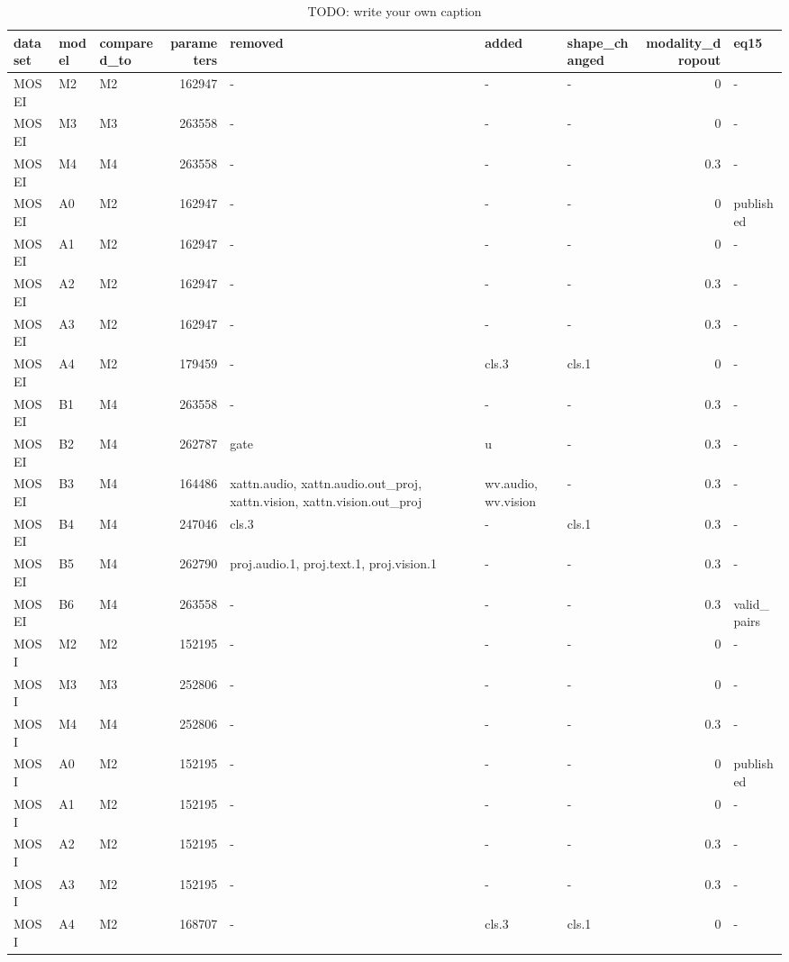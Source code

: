 \begin{table}
\caption{TODO: write your own caption}\label{tab:T10-mosei-mosi-parameter-counts}
\scriptsize
\begin{tabularx}{\textheight}{lllr>{\raggedright\arraybackslash}Xllrl}
\toprule
dataset & model & compared\_\allowbreak{}to & parameters & removed & added & shape\_\allowbreak{}changed & modality\_\allowbreak{}dropout & eq15 \\
\midrule
MOSEI & M2 & M2 & 162947 & - & - & - & 0 & - \\
MOSEI & M3 & M3 & 263558 & - & - & - & 0 & - \\
MOSEI & M4 & M4 & 263558 & - & - & - & 0.3 & - \\
MOSEI & A0 & M2 & 162947 & - & - & - & 0 & published \\
MOSEI & A1 & M2 & 162947 & - & - & - & 0 & - \\
MOSEI & A2 & M2 & 162947 & - & - & - & 0.3 & - \\
MOSEI & A3 & M2 & 162947 & - & - & - & 0.3 & - \\
MOSEI & A4 & M2 & 179459 & - & cls.3 & cls.1 & 0 & - \\
MOSEI & B1 & M4 & 263558 & - & - & - & 0.3 & - \\
MOSEI & B2 & M4 & 262787 & gate & u & - & 0.3 & - \\
MOSEI & B3 & M4 & 164486 & xattn.audio, xattn.audio.out\_\allowbreak{}proj, xattn.vision, xattn.vision.out\_\allowbreak{}proj & wv.audio, wv.vision & - & 0.3 & - \\
MOSEI & B4 & M4 & 247046 & cls.3 & - & cls.1 & 0.3 & - \\
MOSEI & B5 & M4 & 262790 & proj.audio.1, proj.text.1, proj.vision.1 & - & - & 0.3 & - \\
MOSEI & B6 & M4 & 263558 & - & - & - & 0.3 & valid\_\allowbreak{}pairs \\
MOSI & M2 & M2 & 152195 & - & - & - & 0 & - \\
MOSI & M3 & M3 & 252806 & - & - & - & 0 & - \\
MOSI & M4 & M4 & 252806 & - & - & - & 0.3 & - \\
MOSI & A0 & M2 & 152195 & - & - & - & 0 & published \\
MOSI & A1 & M2 & 152195 & - & - & - & 0 & - \\
MOSI & A2 & M2 & 152195 & - & - & - & 0.3 & - \\
MOSI & A3 & M2 & 152195 & - & - & - & 0.3 & - \\
MOSI & A4 & M2 & 168707 & - & cls.3 & cls.1 & 0 & - \\

\end{tabularx}
\end{table}
